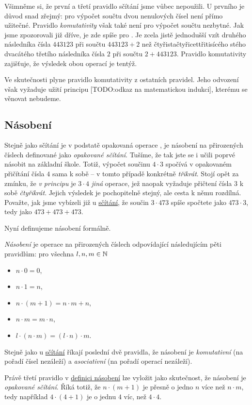 Všimněme si, že první a třetí pravidlo sčítání jsme vůbec nepoužili. U prvního
je důvod snad zřejmý: pro výpočet součtu dvou nenulových čísel není přímo
užitečné. Pravidlo \emph{komutativity} však také není pro výpočet součtu
nezbytné. Jak jsme zpozorovali již dříve, je zde spíše pro . Je
zcela jistě jednodušší vzít druhého následníka čísla $443123$ při součtu $443123
+ 2$ než čtyřistačtyřicettřitisícého stého dvacátého třetího následníka čísla
$2$ při součtu $2 + 443123$. Pravidlo komutativity zajišťuje, že výsledek obou
operací je tentýž.

\begin{remark}
  Ve skutečnosti plyne pravidlo komutativity z ostatních pravidel. Jeho odvození
  však vyžaduje užití principu [TODO:odkaz na matematickou indukci], kterému se
  věnovat nebudeme.
\end{remark}

\subsection{Násobení}
\label{ssec:nasobeni}

Stejně jako sčítání je v podstatě opakovaná operace , je
násobení na přirozených číslech definované jako \emph{opakované sčítání}.
Tušíme, že tak jste se i učili poprvé násobit na základní škole. Totiž, výpočet
součinu $4 \cdot 3$ spočívá v opakovaném přičítání čísla $4$ sama k sobě -- v
tomto případě konkrétně \emph{třikrát}. Stojí opět za zmínku, že \emph{v
principu} je $3 \cdot 4$ \emph{jiná} operace, jež naopak vyžaduje přičtení čísla
$3$ k sobě \emph{čtyřikrát}. Jejich výsledek je pochopitelně stejný, ale cesta k
němu rozdílná. Považte, jak jsme vybízeli již u \hyperref[def:scitani]{sčítání},
že součin $3 \cdot 473$ spíše spočtete jako $473 \cdot 3$, tedy jako $473 + 473
+ 473$.

Nyní definujeme násobení formálně.
\begin{definition}[Násobení]
  \label{def:nasobeni}
  \emph{Násobení} je operace na přirozených číslech odpovídající následujícím
  pěti pravidlům: pro všechna $l, n, m \in \mathbb{N}$
  \begin{itemize}
    \item $n \cdot 0 = 0$,
    \item $n \cdot 1 = n$,
    \item $n \cdot (m + 1) = n \cdot m + n$,
    \item $n \cdot m = m \cdot n$,
    \item $l \cdot (n \cdot m) = (l \cdot n) \cdot m$.
  \end{itemize}
\end{definition}
Stejně jako u \hyperref[def:scitani]{sčítání} říkají poslední dvě pravidla, že
násobení je \emph{komutativní} (na pořadí čísel nezáleží) a \emph{asociativní}
(na pořadí operací nezáleží).
\begin{remark}
  Právě třetí pravidlo v \hyperref[def:nasobeni]{definici násobení} lze vyložit
  jako skutečnost, že násobení je \emph{opakované sčítání}. Říká totiž, že $n
  \cdot (m + 1)$ je přesně o jedno $n$ více než $n \cdot m$, tedy například $4
  \cdot (4 + 1)$ je o jednu $4$ víc, než $4 \cdot 4$.
\end{remark}

